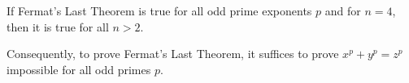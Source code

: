 If Fermat's Last Theorem is true for all odd prime exponents $p$ and for $n = 4$, then it is true for all $n > 2$.

Consequently, to prove Fermat's Last Theorem, it suffices to prove $x^p + y^p = z^p$ impossible for all odd primes $p$.
